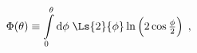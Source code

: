 \begin{equation}
\label{def_Phi}
\Phi(\theta) \equiv
\int\limits_0^\theta {\rm d}\phi\; 
\Ls{2}{\phi} \ln \left(2 \cos \tfrac{\phi}{2} \right) \; , 
\end{equation}

